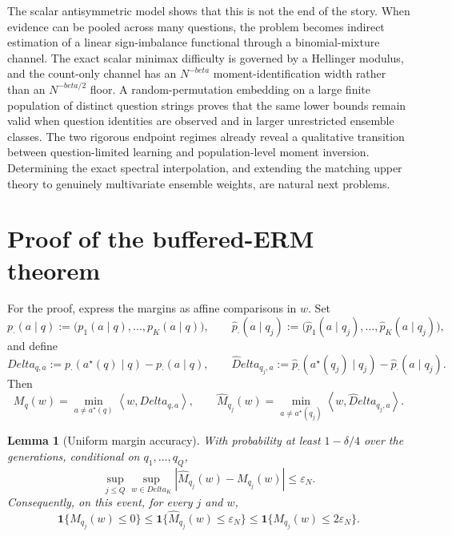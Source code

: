 \documentclass[11pt]{article}
\def\beta{beta}%
\def\Delta{Delta}%
\newtheorem{lemma}[theorem]{Lemma}
\newcommand{\one}{\mathbf 1}
\newcommand{\eps}{\varepsilon}
\newcommand{\abs}[1]{\left|#1\right|}
\newcommand{\inner}[2]{\left\langle#1,#2\right\rangle}
\newcommand\ced[1]{{\color{teal!70!black} #1}}
\begin{document}
The scalar antisymmetric model shows that this is not the end of the story.  When evidence can be pooled across many questions, the problem becomes indirect estimation of \ced{a linear sign-imbalance functional} through a binomial-mixture channel.  The exact scalar minimax difficulty is governed by a Hellinger modulus, and the count-only channel has an $N^{-\beta}$ moment-identification width rather than an $N^{-\beta/2}$ floor.  A random-permutation embedding on a large finite population of distinct question strings proves that the same lower bounds remain valid when question identities are observed and in larger unrestricted ensemble classes.  The two rigorous endpoint regimes already reveal a qualitative transition between question-limited learning and population-level moment inversion.  Determining the exact spectral interpolation, and extending the matching upper theory to genuinely multivariate ensemble weights, are natural next problems.

\appendix

\section{Proof of the buffered-ERM theorem}
\label{app:buffered-proof}

For the proof, express the margins as affine comparisons in $w$.  Set
\[
p_\cdot(a\mid q)
:=
\bigl(p_1(a\mid q),\dots,p_K(a\mid q)\bigr),
\qquad
\widehat p_\cdot(a\mid q_j)
:=
\bigl(\widehat p_1(a\mid q_j),\dots,
\widehat p_K(a\mid q_j)\bigr),
\]
and define
\begin{equation}
\label{eq:gap-vectors}
\Delta_{q,a}
:=
p_\cdot(a^\star(q)\mid q)-p_\cdot(a\mid q),
\qquad
\widehat\Delta_{q_j,a}
:=
\widehat p_\cdot(a^\star(q_j)\mid q_j)
-\widehat p_\cdot(a\mid q_j).
\end{equation}
Then
\begin{equation}
\label{eq:margin-linear-form}
M_q(w)=\min_{a\ne a^\star(q)}\inner{w}{\Delta_{q,a}},
\qquad
\widehat M_{q_j}(w)
=\min_{a\ne a^\star(q_j)}\inner{w}{\widehat\Delta_{q_j,a}}.
\end{equation}

\begin{lemma}[Uniform margin accuracy]
\label{lem:margin-accuracy}
With probability at least $1-\delta/4$ over the generations, conditional on $q_1,\dots,q_Q$,
\begin{equation}
\label{eq:margin-accuracy}
\sup_{j\le Q}\sup_{w\in\Delta_K}
\abs{\widehat M_{q_j}(w)-M_{q_j}(w)}
\le\eps_N.
\end{equation}
Consequently, on this event, for every $j$ and $w$,
\begin{equation}
\label{eq:sandwich}
\one\{M_{q_j}(w)\le0\}
\le
\one\{\widehat M_{q_j}(w)\le\eps_N\}
\le
\one\{M_{q_j}(w)\le2\eps_N\}.
\end{equation}
\end{lemma}
\end{document}
